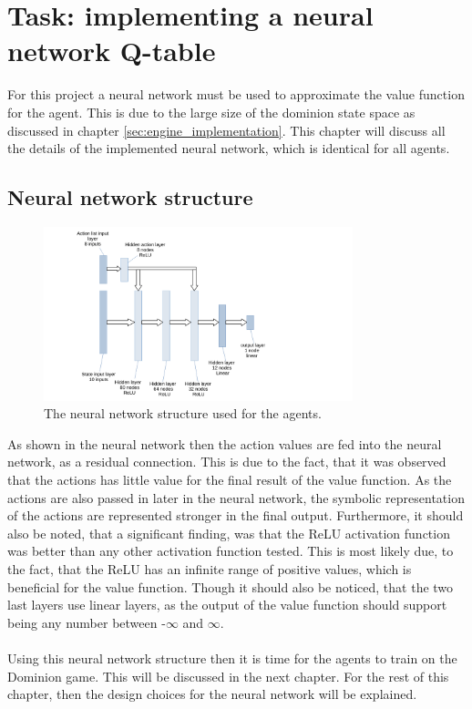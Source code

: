 \chapter{Task: implementing a neural network Q-table} \label{ch:neural_networks}
For this project a neural network must be used to approximate the value function for the agent. This is due to the large size of the dominion state space as discussed in chapter \ref{sec:engine_implementation}. This chapter will discuss all the details of the implemented neural network, which is identical for all agents.

\section{Neural network structure}
\begin{figure}[H]
    \centering
    \includegraphics[width=0.8\textwidth]{img/NN_model.pdf}
    \caption{The neural network structure used for the agents.}
    \label{fig:neural_network}
\end{figure}
As shown in the neural network then the action values are fed into the neural network, as a residual connection. This is due to the fact, that it was observed that the actions has little value for the final result of the value function. As the actions are also passed in later in the neural network, the symbolic representation of the actions are represented stronger in the final output. Furthermore, it should also be noted, that a significant finding, was that the ReLU activation function was better than any other activation function tested. This is most likely due, to the fact, that the ReLU has an infinite range of positive values, which is beneficial for the value function. Though it should also be noticed, that the two last layers use linear layers, as the output of the value function should support being any number between -$\infty$ and $\infty$.\\\\
Using this neural network structure then it is time for the agents to train on the Dominion game. This will be discussed in the next chapter.
For the rest of this chapter, then the design choices for the neural network will be explained. 

